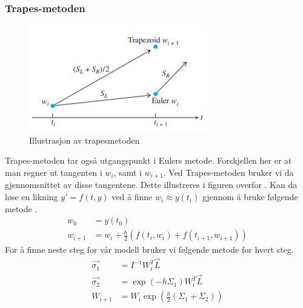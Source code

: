 \subsubsection{Trapes-metoden}
\begin{figure}[!ht]
\begin{center}
\includegraphics{rapport/teori/bilder/trapezoid.PNG}
\caption{Illustrasjon av trapesmetoden}
\label{fig:rotasjon}
\end{center}
\end{figure}\newline\newline
Trapes-metoden tar også utgangspunkt i Eulers metode. Forskjellen her er at man regner ut tangenten i $w_i$, samt i $w_{i+1}$. Ved Trapes-metoden bruker vi da gjennomsnittet av disse tangentene. Dette illustreres i figuren overfor \cite{MATEMATIKK:1}.\newline\newline
Kan da løse en likning $y' = f(t, y)$ ved å finne $w_i \approx y(t_i)$ gjennom å bruke følgende metode \cite{MATEMATIKK:1}. 
\begin{equation}
\begin{aligned}
    w_0&=y(t_0)\\
    w_{i+1}&=w_i + \frac{h}{2}(f(t_i, w_i)+f(t_{i+1}, w_{i+1}))
\end{aligned}
\end{equation}
For å finne neste steg for vår modell bruker vi følgende metode for hvert steg.
\begin{equation}
\begin{aligned}
    \Vec{\sigma_1}&=I^{-1}W^T_i\Vec{L}\\
    \Vec{\sigma_2}&=\exp(-h\Sigma_1)W^T_i\Vec{L}\\
    W_{i+1}&=W_i\exp(\frac{h}{2}(\Sigma_1 + \Sigma_2))
\end{aligned}
\end{equation}

